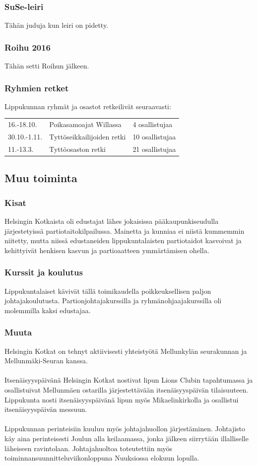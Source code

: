 \documentclass[a4paper, 12pt, finnish]{report} %
\begin{document}
\subsubsection{SuSe-leiri}
Tähän juduja kun leiri on pidetty.
\subsubsection{Roihu 2016}
Tähän setti Roihun jälkeen.
\subsubsection{Ryhmien retket}
Lippukunnan ryhmät ja osastot retkeilivät seuraavasti:
\begin{center}
	\begin{tabular}{l l l}
		16.-18.10. & Poikasamoajat Willassa & 4 osallistujaa\\
		30.10.-1.11. & Tyttöseikkailijoiden retki & 10 osallistujaa\\
		11.-13.3. & Tyttöosaston retki & 21 osallistujaa\\
	\end{tabular}
\end{center}
\subsection{Muu toiminta}
\subsubsection{Kisat}
Helsingin Kotkaista oli edustajat lähes jokaisissa pääkaupunkiseudulla järjestetyissä partiotaitokilpailussa. Mainetta ja kunniaa ei niistä kummemmin niitetty, mutta niissä edustaneiden lippukuntalaisten partiotaidot kasvoivat ja kehittyivät henkisen kasvun ja partioaatteen ymmärtämisen ohella.
\subsubsection{Kurssit ja koulutus}
Lippukuntalaiset kävivät tällä toimikaudella poikkeuksellisen paljon johtajakoulutusta. Partionjohtajakurssilla ja ryhmänohjaajakurssilla oli molemmilla kaksi edustajaa.
\subsubsection{Muuta}
Helsingin Kotkat on tehnyt aktiivisesti yhteistyötä Mellunkylän seurakunnan ja Mellunmäki-Seuran kanssa.\\ 
\\Itsenäisyyspäivänä Helsingin Kotkat nostivat lipun Lions Clubin tapahtumassa ja osallistuivat Mellunmäen ostarilla järjestettävään itsenäisyyspäivän tilaisuuteen. Lippukunta nosti itsenäisyyspäivänä lipun myös Mikaelinkirkolla ja osallistui itsenäisyyspäivän messuun.\\
\\Lippukunnan perinteisiin kuuluu myös johtajahuollon järjestäminen. Johtajisto käy aina perinteisesti Joulun alla keilaamassa, jonka jälkeen siirrytään illalliselle läheiseen ravintolaan. Johtajahuoltoa toteutettiin myös toiminnansuunnitteluviikonloppuna Nuuksiossa elokuun lopulla.
\newpage
\end{document}
